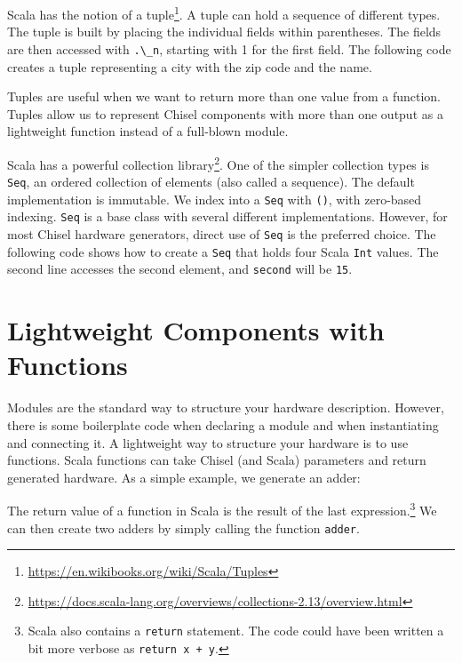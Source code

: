 \documentclass[%
    10pt,
    headinclude, footinclude=false,
    openright, %
    notitlepage,
    cleardoublepage=empty,
    headsepline,
    numbers=noenddot,
    bibliography=totoc, index=totoc,
    ]{scrbook}
\newcommand{\code}[1]{{\lstinline[basicstyle=\small\ttfamily]{#1}}}
\newcommand{\codefoot}[1]{{\lstinline[basicstyle=\footnotesize\ttfamily]{#1}}}
\newcommand{\myref}[2]{\href{#1}{#2}}
\renewcommand{\myref}[2]{{#2}{\footnote{\url{#1}}}}
\begin{document}
Scala has the notion of a \myref{https://en.wikibooks.org/wiki/Scala/Tuples}{tuple}.
A tuple can hold a sequence of different types. The tuple is built by placing the individual fields
within parentheses. The fields are then accessed with \code{.\_n}, starting with 1 for the first field.
The following code creates a tuple representing a city with the zip code and the name.



\noindent Tuples are useful when we want to return more than one value from a function.
Tuples allow us to represent Chisel components with more than one output as a lightweight
function instead of a full-blown module.

Scala has a powerful \myref{https://docs.scala-lang.org/overviews/collections-2.13/overview.html}{collection library}.
One of the simpler collection types is \code{Seq}, an ordered collection of elements (also called a sequence).
The default implementation is immutable. We index into a \code{Seq} with \code{()},
with zero-based indexing.
\code{Seq} is a base class with several different implementations.
However, for most Chisel hardware generators, direct use of \code{Seq}
is the preferred choice. The following code shows how to create a \code{Seq}
that holds four Scala \code{Int} values. The second line accesses the
second element, and \code{second} will be \code{15}.






\section{Lightweight Components with Functions}
\label{sec:functions}


Modules are the standard way to structure your hardware description.
However, there is some boilerplate code when declaring a module and when instantiating and
connecting it.
A lightweight way to structure your hardware is to use functions.
Scala functions can take Chisel (and Scala) parameters and return generated hardware.
As a simple example, we generate an adder:


\noindent The return value of a function in Scala is the result of the last
expression.\footnote{Scala also contains a \codefoot{return} statement. The code could have been written
a bit more verbose as \codefoot{return x + y}.}
We can then create two adders by simply calling the function \code{adder}.
\end{document}
